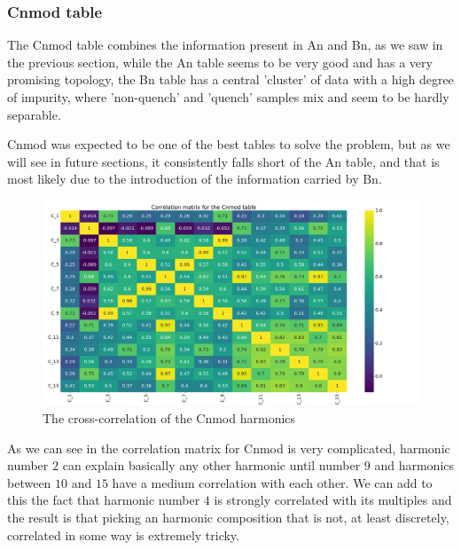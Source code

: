 \subsubsection{Cnmod table}
The Cnmod table combines the information present in An and Bn, as we saw in the previous section,
while the An table seems to be very good and has a very promising topology, the Bn table has a
central 'cluster' of data with a high degree of impurity, where 'non-quench' and 'quench' samples
mix and seem to be hardly separable.

Cnmod was expected to be one of the best tables to solve the problem, but as we will see in future
sections, it consistently falls short of the An table, and that is most likely due to the
introduction of the information carried by Bn.
\begin{figure}[h!]
	\centering
	\includegraphics[width=\linewidth]{img/Cnmod_corr_matrix.png}
	\caption{The cross-correlation of the Cnmod harmonics} \label{fig:cnmod-corr}
\end{figure}

As we can see in  the correlation matrix for Cnmod is very complicated,
harmonic number $2$ can explain basically any other harmonic until number $9$ and harmonics between
$10$ and $15$ have a medium correlation with each other. We can add to this the fact that harmonic
number $4$ is strongly correlated with its multiples and the result is that picking an harmonic
composition that is not, at least discretely, correlated in some way is extremely tricky.

